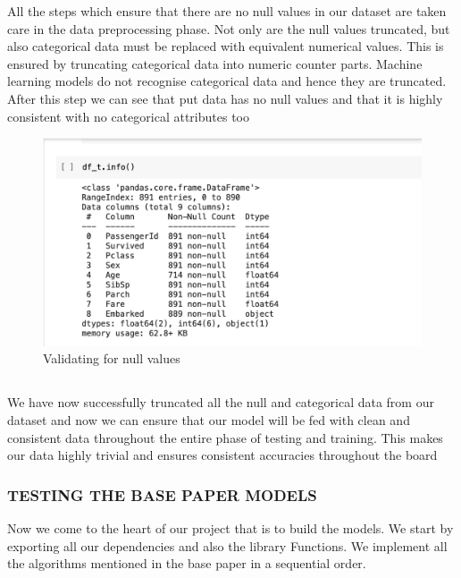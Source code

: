 \documentclass[12pt]{article}
\newcommand{\nd}{\noindent}
\newcommand{\subsize}{\fontsize{14pt}{12pt}\selectfont}
\begin{document}
\nd All the steps which ensure that there are no null values in our dataset are taken care in the data preprocessing phase. Not only are the null values truncated, but also categorical data must be replaced with equivalent numerical values. This is ensured by truncating categorical data into numeric counter parts. Machine learning models do not recognise categorical data and hence they are truncated.
\newpage 
\nd After this step we can see that put data has no null values and that it is highly consistent with no categorical attributes too 

\begin{center}
\begin{figure}[h]
\centerline{\includegraphics[scale=.35]{part7.png}}
\caption{Validating for null values}
\end{figure}
\end{center}
\newpage 
\subsection{\textbf{\subsize{TESTING}}}
\nd We have now successfully truncated all the null and categorical data from our dataset and now we can ensure that our model will be fed with clean and consistent data throughout the entire phase of testing and training. This makes our data highly trivial and ensures consistent accuracies throughout the board 

\subsubsection{\textbf{TESTING THE BASE PAPER MODELS}}
Now we come to the heart of our project that is to build the models. We start by exporting all our dependencies and also the library Functions. We implement all the algorithms mentioned in the base paper in a sequential order. 
\end{document}
